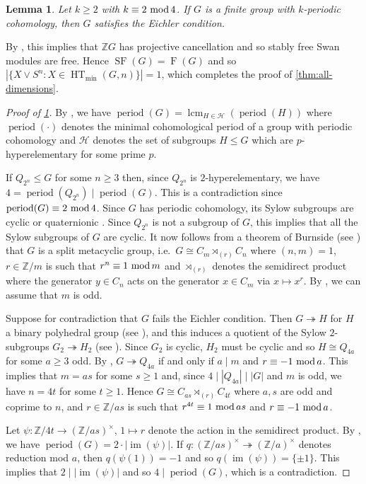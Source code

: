 \documentclass[11pt,leqno,a4paper]{amsart}
\newcommand{\Z}{\mathbb{Z}}
\renewcommand{\mod}{\,\,\text{\normalfont mod}\,}
\DeclareMathOperator{\IM}{im}
\DeclareMathOperator{\SF}{SF}
\DeclareMathOperator{\HT}{HT}
\DeclareMathOperator{\FF}{F}
\DeclareMathOperator{\per}{period}
\DeclareMathOperator{\lcm}{lcm}
\newtheorem{lemma}[thm]{Lemma}
\theoremstyle{definition}
\theoremstyle{remark}
\theoremstyle{custom}
\begin{document}
\begin{lemma} \label{lemma:groups-eichler}
Let $k \ge 2$ with $k \equiv 2 \mod 4$. If $G$ is a finite group with $k$-periodic cohomology, then $G$ satisfies the Eichler condition.
\end{lemma}

By \cite{Sw62}, this implies that $\Z G$ has projective cancellation and so stably free Swan modules are free. Hence $\SF(G)=\FF(G)$ and so $|\{X \vee S^n : X \in \HT_{\min}(G,n)\}|=1$, which completes the proof of \cref{thm:all-dimensions}.

\begin{proof}[Proof of \cref{lemma:groups-eichler}]
By \cite[Theorem 1.10]{DM85}, we have $\per(G) = \lcm_{H \in \mathcal{H}}(\per(H))$ where $\per(\cdot)$ denotes the minimal cohomological period of a group with periodic cohomology and $\mathcal{H}$ denotes the set of subgroups $H \le G$ which are $p$-hyperelementary for some prime $p$. 

If $Q_{2^n} \le G$ for some $n \ge 3$ then, since $Q_{2^n}$ is $2$-hyperelementary, we have $4 = \per(Q_{2^n}) \mid \per(G)$. This is a contradiction since $\per(G) \equiv 2 \mod 4$.
Since $G$ has periodic cohomology, its Sylow subgroups are cyclic or quaternionic \cite[XII.11.6]{CE56}. Since $Q_{2^n}$ is not a subgroup of $G$, this implies that all the Sylow subgroups of $G$ are cyclic. It now follows from a theorem of Burnside (see \cite[Theorem 1.8]{DM85}) that $G$ is a split metacyclic group, i.e.~$G \cong C_m \rtimes_{(r)} C_n$ where $(n,m)=1$, $r \in \Z/m$ is such that $r^n \equiv 1 \mod m$ and $\rtimes_{(r)}$ denotes the semidirect product where the generator $y \in C_n$ acts on the generator $x \in  C_m$ via $x \mapsto x^r$.
By \cite[p165]{Jo03a}, we can assume that $m$ is odd.

Suppose for contradiction that $G$ fails the Eichler condition. Then $G \twoheadrightarrow H$ for $H$ a binary polyhedral group (see \cite[Proposition 1.5]{Ni21a}), and this induces a quotient of the Sylow $2$-subgroups $G_2 \twoheadrightarrow H_2$ (see \cite[Lemma 6.6]{Ni19}). Since $G_2$ is cyclic, $H_2$ must be cyclic and so $H \cong Q_{4a}$ for some $a \ge 3$ odd.
By \cite[Lemma 2.6]{Ni20b}, $G \twoheadrightarrow Q_{4a}$ if and only if $a \mid m$ and $r \equiv -1 \mod a$. This implies that $m=as$ for some $s \ge 1$ and, since $4 \mid |Q_{4a}| \mid |G|$ and $m$ is odd, we have $n=4t$ for some $t \ge 1$. Hence $G \cong C_{as} \rtimes_{(r)} C_{4t}$ where $a, s$ are odd and coprime to $n$, and $r \in \Z/as$ is such that $r^{4t} \equiv 1 \mod as$ and $r \equiv -1 \mod a$.

Let $\psi: \Z/4t \to (\Z/as)^\times$, $1 \mapsto r$ denote the action in the semidirect product. By \cite[p229]{DM85}, we have $\per(G) = 2 \cdot |\IM(\psi)|$. If $q : (\Z/as)^\times \twoheadrightarrow (\Z/a)^\times$ denotes reduction mod $a$, then $q(\psi(1))=-1$ and so $q(\IM(\psi)) = \{\pm 1\}$. This implies that $2 \mid |\IM(\psi)|$ and so $4 \mid \per(G)$, which is a contradiction.
\end{proof}
\end{document}
